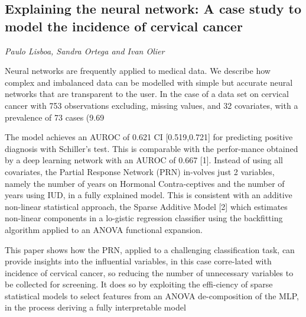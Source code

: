 \documentclass[../booklet.tex]{subfiles}
\begin{document}
\subsection[Explaining the neural network: A case study to model the incidence of cervical cancer. {\it Paulo Lisboa, Sandra Ortega and Ivan Olier}]{Explaining the neural network: A case study to model the incidence of cervical cancer}
  

\begin{center}
  {\it Paulo Lisboa, Sandra Ortega and Ivan Olier}
\end{center}


Neural networks are frequently applied to medical data. We describe how complex and imbalanced data can be modelled with simple but accurate neural networks that are transparent to the user. In the case of a data set on cervical cancer with 753 observations excluding, missing values, and 32 covariates, with a prevalence of 73 cases (9.69%

     The model achieves an AUROC of 0.621 CI [0.519,0.721] for predicting positive diagnosis with Schiller's test.  This is comparable with the perfor-mance obtained by a deep learning network with an AUROC of 0.667 [1]. Instead of using all covariates, the Partial Response Network (PRN) in-volves just 2 variables, namely the number of years on Hormonal Contra-ceptives and the number of years using IUD, in a fully explained model. This is consistent with an additive non-linear statistical approach, the Sparse Additive Model [2] which estimates non-linear components in a lo-gistic regression classifier using the backfitting algorithm applied to an ANOVA functional expansion.

     This paper shows how the PRN, applied to a challenging classification task, can provide insights into the influential variables, in this case corre-lated with incidence of cervical cancer, so reducing the number of unnecessary variables to be collected for screening. It does so by exploiting the effi-ciency of sparse statistical models to select features from an ANOVA de-composition of the MLP, in the process deriving a fully interpretable model

\end{document}
